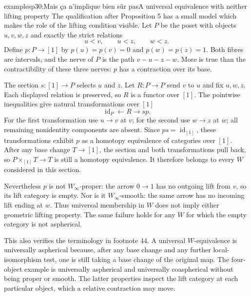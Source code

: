 \begin{dcomment}{examples}{p30:Mais ça n'implique bien sûr pas}{A universal equivalence with neither lifting property}
The qualification after Proposition 5 has a small model which makes the role of the lifting condition visible. Let $P$ be the poset with objects $u,v,w,z$ and exactly the strict relations
\[
 u<v,\qquad u<z,\qquad w<z.
\]
Define $p:P\to[1]$ by $p(u)=p(v)=0$ and $p(w)=p(z)=1$. Both fibres are intervals, and the nerve of $P$ is the path $v-u-z-w$. More is true than the contractibility of these three nerves: $p$ has a contraction over its base.

The section $s:[1]\to P$ selects $u$ and $z$. Let $R:P\to P$ send $v$ to $u$ and fix $u,w,z$. Each displayed relation is preserved, so $R$ is a functor over $[1]$. The pointwise inequalities give natural transformations over $[1]$
\[
 \operatorname{id}_P\longleftarrow R\longrightarrow sp.
\]
For the first transformation use $u\to v$ at $v$; for the second use $w\to z$ at $w$; all remaining nonidentity components are absent. Since $ps=\operatorname{id}_{[1]}$, these transformations exhibit $p$ as a homotopy equivalence of categories over $[1]$. After any base change $T\to[1]$, the section and both transformations pull back, so $P\times_{[1]}T\to T$ is still a homotopy equivalence. It therefore belongs to every $W$ considered in this section.

Nevertheless $p$ is not $W_\infty$-proper: the arrow $0\to1$ has no outgoing lift from $v$, so its lift category is empty. Nor is it $W_\infty$-smooth: the same arrow has no incoming lift ending at $w$. Thus universal membership in $W$ does not imply either geometric lifting property. The same failure holds for any $W$ for which the empty category is not aspherical.

This also verifies the terminology in footnote 44. A universal $W$-equivalence is universally aspherical because, after any base change and any further local-isomorphism test, one is still taking a base change of the original map. The four-object example is universally aspherical and universally coaspherical without being proper or smooth. The latter properties inspect the lift category at each particular object, which a relative contraction may move.
\end{dcomment}

